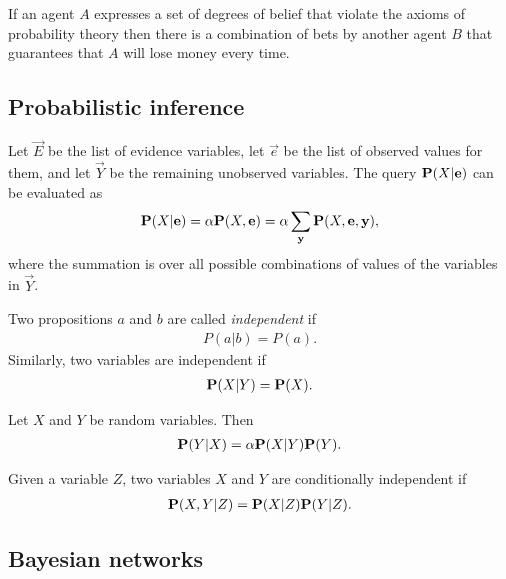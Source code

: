 \documentclass{article}
\begin{document}
\begin{theorem}[De Finetti]
	If an agent $A$ expresses a set of degrees of belief that violate
	the axioms of probability theory then there is a combination of
	bets by another agent $B$ that guarantees that $A$ will lose money
	every time.
\end{theorem}

\subsection{Probabilistic inference}

\begin{lemma}[R\&N p. 493]
	Let $\vec E$ be the list of evidence variables, let $\vec e$ be the list of observed
	values for them, and let $\vec Y$ be the remaining unobserved variables. The query
	$\P(X|\vec e)$ can be evaluated as
	\begin{align*}
		\P(X|\vec e) = \alpha\P(X, \vec e) = \alpha \sum_{\vec y} \P(X,\vec e, \vec y),
	\end{align*}
	where the summation is over all possible combinations of values of the variables in
	$\vec Y$.
\end{lemma}

\begin{definition}[R\&N p. 494]
	Two propositions $a$ and $b$ are called \emph{independent} if
	\begin{align*}
		P(a|b) = P(a).
	\end{align*}
	Similarly, two variables are independent if
	\begin{align*}
		\P(X|Y) = \P(X).
	\end{align*}
\end{definition}

\begin{theorem}
	Let $X$ and $Y$ be random variables. Then
	\begin{align*}
		\P(Y|X) = \alpha \P(X|Y)\P(Y).
	\end{align*}
\end{theorem}

\begin{definition}[R\&N p. 498]
	Given a variable $Z$, two variables $X$ and $Y$ are conditionally independent
	if
	\begin{align*}
		\P(X,Y|Z) = \P(X|Z)\P(Y|Z).
	\end{align*}
\end{definition}

\subsection{Bayesian networks}
\end{document}
